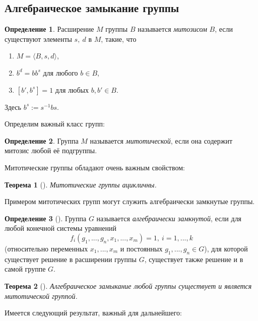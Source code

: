 \documentclass[14pt, dvipsnames, twoside]{extarticle}
\newtheorem{theorem}{Теорема}
\theoremstyle{definition}
\newtheorem{defi}{Определение}
\theoremstyle{remark}
\begin{document}
\subsection{Алгебраическое замыкание группы} 






\begin{defi}
Расширение $M$ группы $B$ называется {\it митозисом} $B$, если существуют элементы $s,\ d$ в $M$, такие, что 

\begin{enumerate}[\bf 1.]
\item $M=\langle B, s, d\rangle$,
\item $b^d=bb^s$ для любого $b\in B$,
\item $[b', b^s]=1$ для любых $b, b'\in B$.
\end{enumerate}
Здесь $b^s:=s^{-1}bs$.
\end{defi}

Определим важный класс групп:

\begin{defi}
Группа $M$ называется {\it митотической}, если она содержит митозис любой её подгруппы.
\end{defi}

Митотические группы обладают очень важным свойством:

\begin{theorem}[\cite{BDH}]\label{mitac_0}
Митотические группы ацикличны. 
\end{theorem}

Примером митотических групп могут служить алгебраически замкнутые группы.

\begin{defi}[\cite{BDH}]
Группа $G$ называется {\it алгебраически замкнутой}, если для любой конечной системы уравнений 
$$f_i(g_1, ..., g_n, x_1, ..., x_m)=1,\ i=1, ..., k$$ (относительно переменных $x_1, ..., x_m$ и постоянных $g_1, ..., g_n\in G$), для которой существует решение в расширении группы $G$, существует также решение и в самой группе $G$. 
\end{defi}

\begin{theorem}[\cite{BDH}]\label{mitac}
Алгебраическое замыкание любой группы существует и является митотической группой.
\end{theorem}

Имеется следующий результат, важный для дальнейшего:
\end{document}
